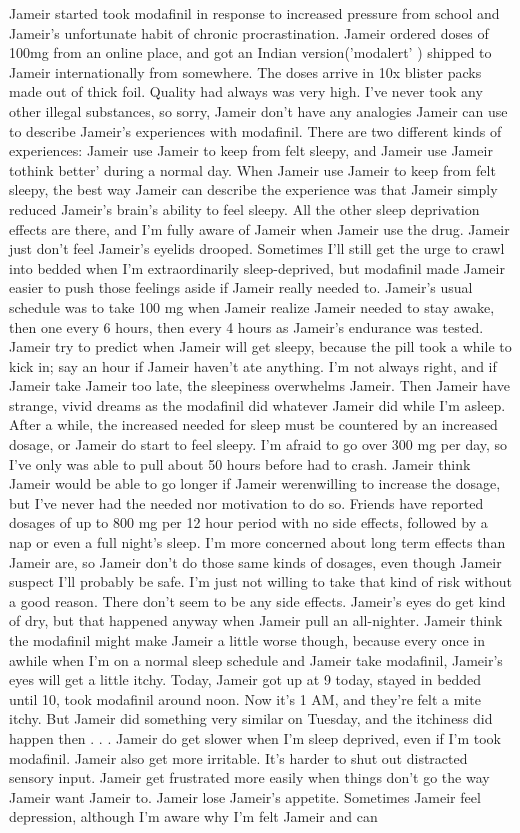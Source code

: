 \documentclass[12pt]{book}
\begin{document}
Jameir started took modafinil in response to increased pressure from school and Jameir's unfortunate habit of chronic procrastination. Jameir ordered doses of 100mg from an online place, and got an Indian version('modalert' ) shipped to Jameir internationally from somewhere. The doses arrive in 10x blister packs made out of thick foil. Quality had always was very high. I've never took any other illegal substances, so sorry, Jameir don't have any analogies Jameir can use to describe Jameir's experiences with modafinil. There are two different kinds of experiences: Jameir use Jameir to keep from felt sleepy, and Jameir use Jameir tothink better' during a normal day. When Jameir use Jameir to keep from felt sleepy, the best way Jameir can describe the experience was that Jameir simply reduced Jameir's brain's ability to feel sleepy. All the other sleep deprivation effects are there, and I'm fully aware of Jameir when Jameir use the drug. Jameir just don't feel Jameir's eyelids drooped. Sometimes I'll still get the urge to crawl into bedded when I'm extraordinarily sleep-deprived, but modafinil made Jameir easier to push those feelings aside if Jameir really needed to. Jameir's usual schedule was to take 100 mg when Jameir realize Jameir needed to stay awake, then one every 6 hours, then every 4 hours as Jameir's endurance was tested. Jameir try to predict when Jameir will get sleepy, because the pill took a while to kick in; say an hour if Jameir haven't ate anything. I'm not always right, and if Jameir take Jameir too late, the sleepiness overwhelms Jameir. Then Jameir have strange, vivid dreams as the modafinil did whatever Jameir did while I'm asleep. After a while, the increased needed for sleep must be countered by an increased dosage, or Jameir do start to feel sleepy. I'm afraid to go over 300 mg per day, so I've only was able to pull about 50 hours before had to crash. Jameir think Jameir would be able to go longer if Jameir werenwilling to increase the dosage, but I've never had the needed nor motivation to do so. Friends have reported dosages of up to 800 mg per 12 hour period with no side effects, followed by a nap or even a full night's sleep. I'm more concerned about long term effects than Jameir are, so Jameir don't do those same kinds of dosages, even though Jameir suspect I'll probably be safe. I'm just not willing to take that kind of risk without a good reason. There don't seem to be any side effects. Jameir's eyes do get kind of dry, but that happened anyway when Jameir pull an all-nighter. Jameir think the modafinil might make Jameir a little worse though, because every once in awhile when I'm on a normal sleep schedule and Jameir take modafinil, Jameir's eyes will get a little itchy. Today, Jameir got up at 9 today, stayed in bedded until 10, took modafinil around noon. Now it's 1 AM, and they're felt a mite itchy. But Jameir did something very similar on Tuesday, and the itchiness did happen then . . .  Jameir do get slower when I'm sleep deprived, even if I'm took modafinil. Jameir also get more irritable. It's harder to shut out distracted sensory input. Jameir get frustrated more easily when things don't go the way Jameir want Jameir to. Jameir lose Jameir's appetite. Sometimes Jameir feel depression, although I'm aware why I'm felt Jameir and can 
\end{document}
